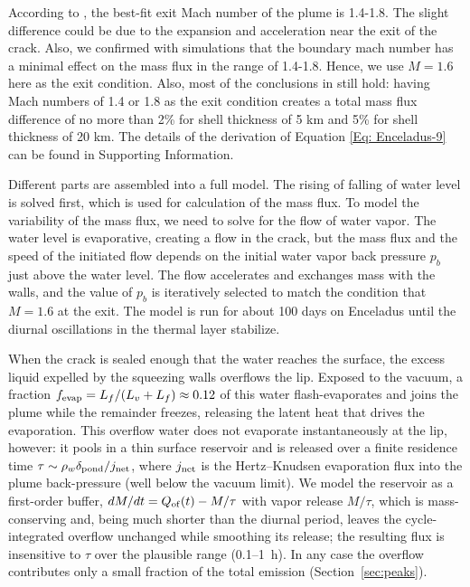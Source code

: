 \documentclass[draft]{agujournal2019}
\begin{document}
According to , the best-fit exit Mach number of the plume is 1.4-1.8. The slight difference could be due to the expansion and acceleration near the exit of the crack. Also, we confirmed with simulations that the boundary mach number has a minimal effect on the mass flux in the range of 1.4-1.8. Hence, we use $M=1.6$ here as the exit condition. Also, most of the conclusions in  still hold: having Mach numbers of 1.4 or 1.8 as the exit condition creates a total mass flux difference of no more than 2\% for shell thickness of 5 km and 5\% for shell thickness of 20 km. The details of the derivation of Equation \ref{Eq: Enceladus-9} can be found in Supporting Information. 

Different parts are assembled into a full model. The rising of falling of water level is solved first, which is used for calculation of the mass flux. To model the variability of the mass flux, we need to solve for the flow of water vapor. The water level is evaporative, creating a flow in the crack, but the mass flux and the speed of the initiated flow depends on the initial water vapor back pressure $p_b$ just above the water level. The flow accelerates and exchanges mass with the walls, and the value of $p_b$ is iteratively selected to match the condition that $M=1.6$ at the exit. The model is run for about 100 days on Enceladus until the diurnal oscillations in the thermal layer stabilize.

When the crack is sealed enough that the water reaches the surface, the excess liquid expelled by the squeezing walls overflows the lip. Exposed to the vacuum, a fraction $f_{\rm evap}=L_f/(L_v+L_f)\approx0.12$ of this water flash-evaporates and joins the plume while the remainder freezes, releasing the latent heat that drives the evaporation. This overflow water does not evaporate instantaneously at the lip, however: it pools in a thin surface reservoir and is released over a finite residence time $\tau\sim\rho_w\delta_{\rm pond}/j_{\rm net}$, where $j_{\rm net}$ is the Hertz--Knudsen evaporation flux into the plume back-pressure (well below the vacuum limit). We model the reservoir as a first-order buffer, $dM/dt = Q_{\rm of}(t)-M/\tau$ with vapor release $M/\tau$, which is mass-conserving and, being much shorter than the diurnal period, leaves the cycle-integrated overflow unchanged while smoothing its release; the resulting flux is insensitive to $\tau$ over the plausible range (0.1--1~h). In any case the overflow contributes only a small fraction of the total emission (Section~\ref{sec:peaks}).
\end{document}
